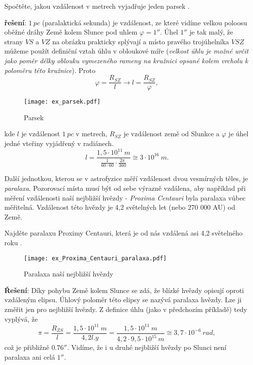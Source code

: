     \begin{example} 
      Spočtěte, jakou vzdálenost v metrech vyjadřuje jeden parsek \protect\cite[s.~3]{Kulhanek2009}.
      
      \textbf{řešení}: $1\ pc$ (paralaktická sekunda) je vzdálenost, ze které vidíme velkou poloosu oběžné 
      dráhy Země kolem Slunce pod uhlem $\varphi = 1''$. Úhel $1''$ je tak malý, že strany $VS$ a $VZ$ na 
      obrázku prakticky splývají a místo pravého trojúhelníka $VSZ$ můžeme použít definiční vztah úhlu v 
      obloukové míře (\emph{velkost úhlu je možné určit jako poměr délky oblouku vymezeného rameny na 
      kružnici opsané kolem vrcholu k poloměru této kružnice}). Proto $$\varphi = \frac{R_{SZ}}{l} 
      \rightarrow l = \frac{R_{SZ}}{\varphi},$$ 

      \begin{figure}[ht!]
          \centering
          \texttt{[image: ex\_parsek.pdf]}
          \caption[Parsek]{Parsek}
          \label{afyz:fig_ex_parsek}
      \end{figure}
      
      kde $l$ je vzdálenost $1\ pc$ v metrech, $R_{SZ}$ je vzdálenost země od Slunkce a $\varphi$ je úhel jedné vteřiny vyjádřený v radiánech. 
      $$l = \frac{1,5\cdot10^{11}\ m}{\frac{1}{60\cdot60}\cdot\frac{2\pi}{360}}\cong 3\cdot10^{16}\ m.$$  
      
    \end{example}
    
   Další jednotkou, kterou se v astrofyzice měří vzdálenost dvou vesmírných těles, je \emph{paralaxa}. 
   Pozorovací místa musí být od sebe výrazně vzdálena, aby například při měření vzdálenosti naší nejbližší 
   hvězdy - \emph{Proxima Centauri} byla paralaxa vůbec měřitelná. Vzdálenost této hvězdy je 4,2 světelných 
   let (nebo 270 000 AU) od Země.
   
    \begin{example}
      Najděte paralaxu Proximy Centauri, která je od nás vzdálená asi 4,2 světelného roku \protect\cite[s.~4]{Kulhanek2009}.
      
      \begin{figure}[ht!]
          \centering
          \texttt{[image: ex\_Proxima\_Centauri\_paralaxa.pdf]}
          \caption[Paralaxa naší nejbližší hvězdy]{Paralaxa naší nejbližší hvězdy}
          \label{afyz:fig_ex_paralaxa}
      \end{figure}
            
      \textbf{Řešení}: Díky pohybu Země kolem Slunce se zdá, že blízké hvězdy opisují oproti vzdáleným 
      elipsu. Úhlový poloměr této elipsy se nazývá paralaxa hvězdy. Lze ji změřit jen pro nejbližší hvězdy. Z 
      definice úhlu (jako v předchozím příkladě) tedy vyplývá, že
      $$\pi = \frac{R_{ZS}}{l} = \frac{1,5\cdot10^{11}\ m}{4,2 l.y} = \frac{1,5\cdot10^{11}\ 
      m}{4,2\cdot9,5\cdot10^{15}\ m}	\cong 3,7\cdot10^{-6}\ rad,$$ což je přibližně $0.76''$. Vidíme, že i u 
      druhé nejbližší hvězdy po Slunci není paralaxa ani celá $1''$.
    \end{example}

\printbibliography[heading=subbibliography]
